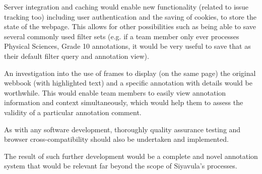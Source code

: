 Server integration and caching would enable new functionality (related to issue tracking too) including user authentication and the saving of cookies, to store the state of the webpage. This allows for other possibilities such as being able to save several commonly used filter sets (e.g. if a team member only ever processes Physical Sciences, Grade 10 annotations, it would be very useful to save that as their default filter query and annotation view). 

An investigation into the use of frames to display (on the same page) the original webbook (with highlighted text) and a specific annotation with details would be worthwhile. This would enable team members to easily view annotation information and context simultaneously, which would help them to assess the validity of a particular annotation comment.

As with any software development, thoroughly quality assurance testing and browser cross-compatibility should also be undertaken and implemented. 

The result of such further development would be a complete and novel annotation system that would be relevant far beyond the scope of Siyavula's processes. 
